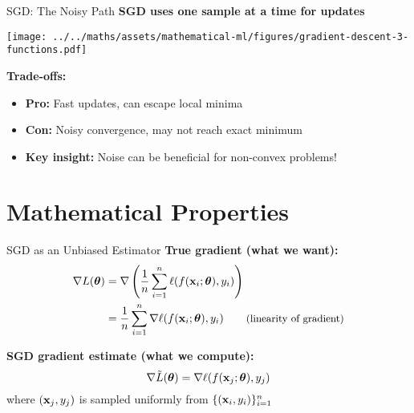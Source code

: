 \documentclass[usenames,dvipsnames]{beamer}
\begin{document}
  \begin{frame}{SGD: The Noisy Path}
    \textbf{SGD uses one sample at a time for updates}
    
    \begin{center}
    \texttt{[image: ../../maths/assets/mathematical-ml/figures/gradient-descent-3-functions.pdf]}
    \end{center}
    
    \pause
    \textbf{Trade-offs:}
    \begin{itemize}[<+->]
        \item \textbf{Pro:} Fast updates, can escape local minima
        \item \textbf{Con:} Noisy convergence, may not reach exact minimum
        \item \textbf{Key insight:} Noise can be beneficial for non-convex problems!
    \end{itemize}
  \end{frame}

  \section{Mathematical Properties}

  \begin{frame}{SGD as an Unbiased Estimator}
    \textbf{True gradient (what we want):}
    \begin{align}
    \nabla L(\boldsymbol{\theta}) &= \nabla \left(\frac{1}{n}\sum_{i=1}^n \ell(f(\mathbf{x}_i;\boldsymbol{\theta}),y_i)\right)\\
    &= \frac{1}{n}\sum_{i=1}^n \nabla \ell(f(\mathbf{x}_i;\boldsymbol{\theta}),y_i) \qquad \text{\small (linearity of gradient)}
    \end{align}

    \pause
    \textbf{SGD gradient estimate (what we compute):}
    $$\nabla \tilde{L}(\boldsymbol{\theta}) = \nabla \ell(f(\mathbf{x}_j;\boldsymbol{\theta}),y_j)$$
    where $(\mathbf{x}_j,y_j)$ is sampled uniformly from $\{(\mathbf{x}_i,y_i)\}_{i=1}^n$
  \end{frame}
\end{document}
